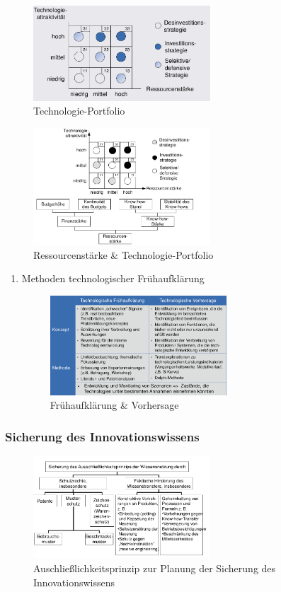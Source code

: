 \documentclass[11pt]{article}
\begin{document}
\begin{figure}[htbp]
\centering
\includegraphics[width=250px]{./pictures/intechpo.png}
\caption{Technologie-Portfolio}
\end{figure} 

\begin{figure}[htbp]
\centering
\includegraphics[width=250px]{./pictures/inrespo.png}
\caption{Ressourcenstärke \& Technologie-Portfolio}
\end{figure} 

\begin{enumerate}
\item Methoden technologischer Frühaufklärung
\label{sec:orgb7513dc}
\begin{figure}[htbp]
\centering
\includegraphics[width=250px]{./pictures/invor.png}
\caption{Frühaufklärung \& Vorhersage}
\end{figure}
\end{enumerate}

\subsubsection{Sicherung des Innovationswissens}
\label{sec:orgd1ad6d9}
\begin{figure}[htbp]
\centering
\includegraphics[width=250px]{./pictures/inauss.png}
\caption{Auschließlichkeitsprinzip zur Planung der Sicherung des Innovationswissens}
\end{figure} 
\end{document}
